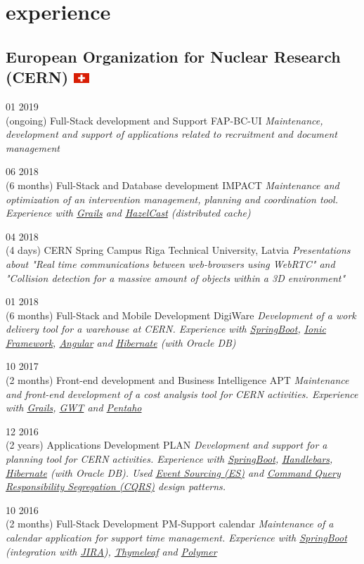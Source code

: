 \documentclass[]{friggeri-cv}
\begin{document}
\section{experience}
	\subsection{European Organization for Nuclear Research (CERN) \includegraphics[width=16pt]{ch} }  
		\begin{entrylist}

			\entry
			{01 2019\\(ongoing)}
			{Full-Stack development and Support}
			{FAP-BC-UI}
			{\emph{Maintenance, development and support of applications related to recruitment and document management} }

			\entry
			{06 2018\\(6 months)}
			{Full-Stack and Database development}
			{IMPACT}
			{\emph{Maintenance and optimization of an intervention management, planning and coordination tool. Experience with \underline{Grails} and \underline{HazelCast} (distributed cache)} }


			\entry
			{04 2018\\(4 days)}
			{CERN Spring Campus}
			{Riga Technical University, Latvia}
			{\emph{Presentations about "Real time communications between web-browsers using WebRTC" and "Collision detection for a massive amount of objects within a 3D environment"} }


			\entry
			{01 2018\\(6 months)}
			{Full-Stack and Mobile Development}
			{DigiWare}
			{\emph{Development of a work delivery tool for a warehouse at CERN. Experience with \underline{SpringBoot}, \underline{Ionic Framework}, \underline{Angular} and \underline{Hibernate} (with Oracle DB) } }

			\entry
			{10 2017\\(2 months)}
			{Front-end development and Business Intelligence}
			{APT}
			{\emph{Maintenance and front-end development of a cost analysis tool for CERN activities. Experience with \underline{Grails}, \underline{GWT} and \underline{Pentaho} } }

			\entry
			{12 2016\\(2 years)}
			{Applications Development}
			{PLAN}
			{\emph{Development and support for a planning tool for CERN activities. Experience with \underline{SpringBoot}, \underline{Handlebars}, \underline{Hibernate} (with Oracle DB). Used \underline{Event Sourcing (ES)} and \underline{Command Query Responsibility Segregation (CQRS)} design patterns. } }

			\entry
			{10 2016\\(2 months)}
			{Full-Stack Development}
			{PM-Support calendar}
			{\emph{Maintenance of a calendar application for support time management. Experience with \underline{SpringBoot} (integration with \underline{JIRA}), \underline{Thymeleaf} and \underline{Polymer}}}


		\end{entrylist}
\end{document}
